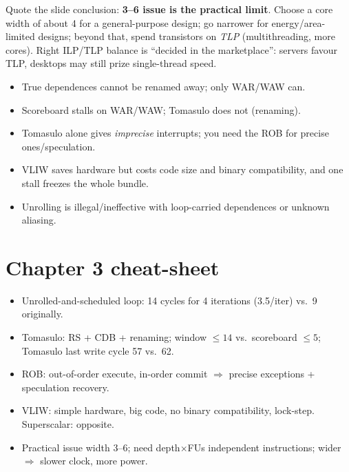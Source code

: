 \begin{dec}
Quote the slide conclusion: \textbf{3--6 issue is the practical limit}. Choose a core width of about 4 for a general-purpose design; go narrower for energy/area-limited designs; beyond that, spend transistors on \emph{TLP} (multithreading, more cores). Right ILP/TLP balance is ``decided in the marketplace'': servers favour TLP, desktops may still prize single-thread speed.
\end{dec}

\begin{trap}
\begin{itemize}
\item True dependences cannot be renamed away; only WAR/WAW can.
\item Scoreboard stalls on WAR/WAW; Tomasulo does not (renaming).
\item Tomasulo alone gives \emph{imprecise} interrupts; you need the ROB for precise ones/speculation.
\item VLIW saves hardware but costs code size and binary compatibility, and one stall freezes the whole bundle.
\item Unrolling is illegal/ineffective with loop-carried dependences or unknown aliasing.
\end{itemize}
\end{trap}

\section{Chapter 3 cheat-sheet}
\begin{key}
\begin{itemize}
\item Unrolled-and-scheduled loop: 14 cycles for 4 iterations (3.5/iter) vs.\ 9 originally.
\item Tomasulo: RS + CDB + renaming; window $\le14$ vs.\ scoreboard $\le5$; Tomasulo last write cycle 57 vs.\ 62.
\item ROB: out-of-order execute, in-order commit $\Rightarrow$ precise exceptions + speculation recovery.
\item VLIW: simple hardware, big code, no binary compatibility, lock-step. Superscalar: opposite.
\item Practical issue width 3--6; need depth$\times$FUs independent instructions; wider $\Rightarrow$ slower clock, more power.
\end{itemize}
\end{key}
